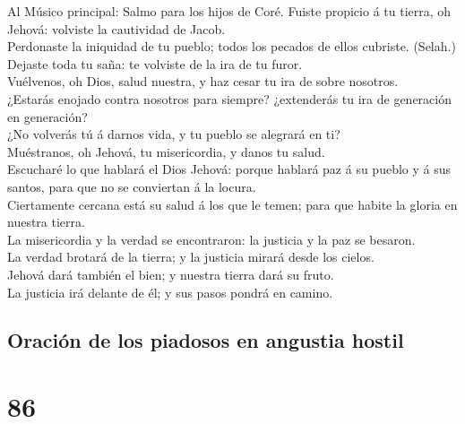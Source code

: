  Al Músico principal: Salmo para los hijos de Coré. Fuiste
propicio á tu tierra, oh Jehová: volviste la cautividad de Jacob.\\
 Perdonaste la iniquidad de tu pueblo; todos los pecados
de ellos cubriste. (Selah.)\\
 Dejaste toda tu saña: te volviste de la ira de tu
furor.\\
 Vuélvenos, oh Dios, salud nuestra, y haz cesar tu ira de
sobre nosotros.\\
 ¿Estarás enojado contra nosotros para siempre?
¿extenderás tu ira de generación en generación?\\
 ¿No volverás tú á darnos vida, y tu pueblo se alegrará en
ti?\\
 Muéstranos, oh Jehová, tu misericordia, y danos tu
salud.\\
 Escucharé lo que hablará el Dios Jehová: porque hablará
paz á su pueblo y á sus santos, para que no se conviertan á la locura.\\
 Ciertamente cercana está su salud á los que le temen;
para que habite la gloria en nuestra tierra.\\
 La misericordia y la verdad se encontraron: la justicia
y la paz se besaron.\\
 La verdad brotará de la tierra; y la justicia mirará
desde los cielos.\\
 Jehová dará también el bien; y nuestra tierra dará su
fruto.\\
 La justicia irá delante de él; y sus pasos pondrá en
camino.

\hypertarget{oraciuxf3n-de-los-piadosos-en-angustia-hostil}{%
\subsection{Oración de los piadosos en angustia
hostil}\label{oraciuxf3n-de-los-piadosos-en-angustia-hostil}}

\hypertarget{section-19-86}{%
\section{86}\label{section-19-86}}

